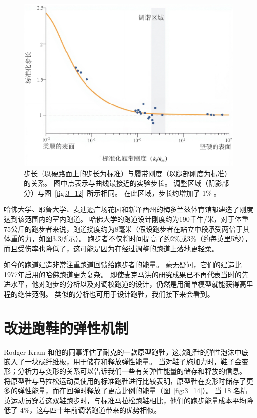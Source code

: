 \begin{figure}[!htb]
	\centering
	\includegraphics[width=1.0\linewidth]{chap3/3_13}
	\caption{步长（以硬路面上的步长为标准）与履带刚度（以腿部刚度为标准）的关系。
		图中点表示与曲线最接近的实验步长。
		调整区域（阴影部分）与图~\ref{fig:3_12}~所示相同。
		在此区域，步长约增加了 1\% \cite{mcmahon1984muscles}。 \label{fig:3_13}}
\end{figure}

哈佛大学、耶鲁大学、麦迪逊广场花园和新泽西州的梅多兰兹体育馆都建造了刚度达到该范围内的室内跑道。
哈佛大学的跑道设计刚度约为190千牛/米，对于体重75公斤的跑步者来说，跑道挠度约为8毫米（假设跑步者在站立中段承受两倍于其体重的力，如图3.3所示）。
跑步者不仅将时间提高了约2\%或3\%（约每英里5秒），而且受伤率也降低了，这可能是因为在经过调整的跑道上落地更轻柔。


如今的跑道建造非常注重跑道回馈给跑步者的能量。
毫无疑问，它们的建造比1977年启用的哈佛跑道更为复杂。
即使麦克马洪的研究成果已不再代表当时的先进水平，他对跑步的分析以及对调校跑道的设计，仍然是用简单模型就能获得高里程的绝佳范例。
类似的分析也可用于设计跑鞋，我们接下来会看到。


\section{改进跑鞋的弹性机制}

Rodger Kram 和他的同事评估了耐克的一款原型跑鞋，这款跑鞋的弹性泡沫中底嵌入了一块碳纤维板，用于储存和释放弹性能量。
当对鞋子施加力时，鞋子会变形；分析力与变形的关系可以告诉我们一些有关弹性能量的储存和释放的信息。
将原型鞋与马拉松运动员使用的标准跑鞋进行比较表明，原型鞋在变形时储存了更多的弹性能量，而在回弹时释放了更高比例的能量（图~\ref{fig:3_14}）。
当 18 名精英运动员穿着这双鞋跑步时，与标准马拉松跑鞋相比，他们的跑步能量成本平均降低了 4\%，这与四十年前调谐跑道带来的优势相似。

